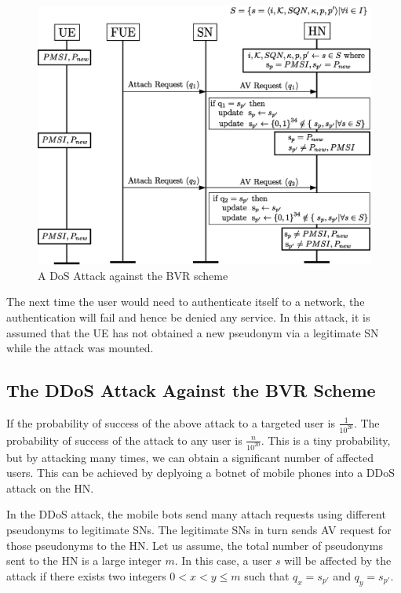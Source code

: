\documentclass{llncs} %
\begin{document}
\begin{figure}[]
  \centering
    \includegraphics[width=.95\textwidth]{DDoS.eps}
  \caption{A DoS Attack against the BVR scheme}
  \label{fig:dos_attack}	
\end{figure}

The next time the user would need to authenticate itself to a network, the authentication will fail and hence be denied any service. In this attack, it is assumed that the UE has not obtained a new pseudonym via a legitimate SN while the attack was mounted.

\subsection{The DDoS Attack Against the BVR Scheme} \label{sec:ddos_attack}
If the probability of success of the above attack to a targeted user is $\frac{1}{10^{20}}$. The probability of success of the attack to any user is $\frac{n}{10^{20}}$. This is a tiny probability, but by attacking many times, we can obtain a significant number of affected users. This can be achieved by deplyoing a botnet of mobile phones into a DDoS attack on the HN.

In the DDoS attack, the mobile bots send many attach requests using different pseudonyms to legitimate SNs. The legitimate SNs in turn sends AV request for those pseudonyms to the HN. Let us assume, the total number of pseudonyms sent to the HN is a large integer $m$. In this case, a user $s$ will be affected by the attack if there exists two integers $0 < x < y \leq m$ such that $q_{x} = s_{p'}$ and $q_{y} = s_{p'}$. 
\end{document}
